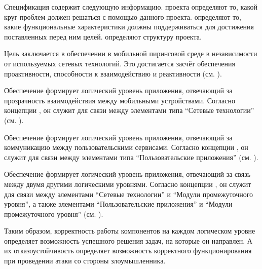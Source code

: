 %
Спецификация  содержит следующую информацию.
%
 проекта определяют то, какой круг проблем должен решаться с помощью данного проекта. 
%
 определяют то, какие функциональные характеристики должны поддерживаться  для достижения поставленных перед ним целей. 
%
 определяют структуру проекта. 



%
Цель  заключается в обеспечении  в мобильной пиринговой среде в независимости от используемых сетевых технологий. 
%
Это достигается засчёт обеспечения проактивности, способности к взаимодействию и реактивности (см. ).

%
Обеспечение  формирует логический уровень приложения, отвечающий за прозрачность взаимодействия между мобильными устройствами.
%
Согласно концепции , он служит для связи между элементами типа ``Сетевые технологии'' (см. ). 

%
Обеспечение  формирует логический уровень приложения, отвечающий за коммуникацию между пользовательскими сервисами. 
%
Согласно концепции , он служит для связи между элементами типа ``Пользовательские приложения'' (см. ). 

%
Обеспечение  формирует логический уровень приложения, отвечающий за связь между двумя другими логическими уровнями. 
%
Согласно концепции , он служит для связи между элементами ``Сетевые технологии'' и ``Модули промежуточного уровня'', а также элементами ``Пользовательские приложения'' и ``Модули промежуточного уровня'' (см. ). 

%
Таким образом, корректность работы компонентов  на каждом логическом уровне определяет возможность успешного решения задач, на которые он направлен. 
%
А их отказоустойчивость определяет возможность корректного функционирования  при проведении атаки со стороны злоумышленника.

